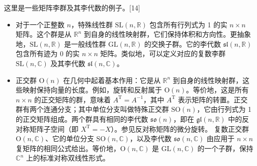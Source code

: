 这里是一些矩阵李群及其李代数的例子。[14]
\begin{itemize}
\item 对于一个正整数 \( n \)，特殊线性群 \( \mathrm{SL}(n, \mathbb{R}) \) 包含所有行列式为 1 的实 \( n \times n \) 矩阵。这个群是从 \( \mathbb{R}^n \) 到自身的线性映射群，它们保持体积和方向性。更抽象地，\( \mathrm{SL}(n, \mathbb{R}) \) 是一般线性群 \( \mathrm{GL}(n, \mathbb{R}) \) 的交换子群。它的李代数 \( \mathfrak{sl}(n, \mathbb{R}) \) 包含所有迹为 0 的实 \( n \times n \) 矩阵。类似地，可以定义对应的复数李群 \( \mathrm{SL}(n, \mathbb{C}) \) 及其李代数 \( \mathfrak{sl}(n, \mathbb{C}) \)。
\item 正交群 \( \mathrm{O}(n) \) 在几何中起着基本作用：它是从 \( \mathbb{R}^n \) 到自身的线性映射群，这些映射保持向量的长度。例如，旋转和反射属于 \( \mathrm{O}(n) \)。等价地，这是所有 \( n \times n \) 的正交矩阵的群，意味着 \( A^{\mathrm{T}} = A^{-1} \)，其中 \( A^{\mathrm{T}} \) 表示矩阵的转置。正交群有两个连通分支；其中单位分支叫做特殊正交群 \( \mathrm{SO}(n) \)，它由行列式为 1 的正交矩阵组成。两个群具有相同的李代数 \( \mathfrak{so}(n) \)，即在 \( \mathfrak{gl}(n, \mathbb{R}) \) 中的反对称矩阵子空间（即 \( X^{\mathrm{T}} = -X \)）。参见反对称矩阵的微分旋转。
复数正交群 \( \mathrm{O}(n, \mathbb{C}) \)、它的单位分支 \( \mathrm{SO}(n, \mathbb{C}) \)，以及李代数 \( \mathfrak{so}(n, \mathbb{C}) \) 由应用于 \( n \times n \) 复矩阵的相同公式给出。等价地，\( \mathrm{O}(n, \mathbb{C}) \) 是 \( \mathrm{GL}(n, \mathbb{C}) \) 的一个子群，保持 \( \mathbb{C}^n \) 上的标准对称双线性形式。
\end{itemize}